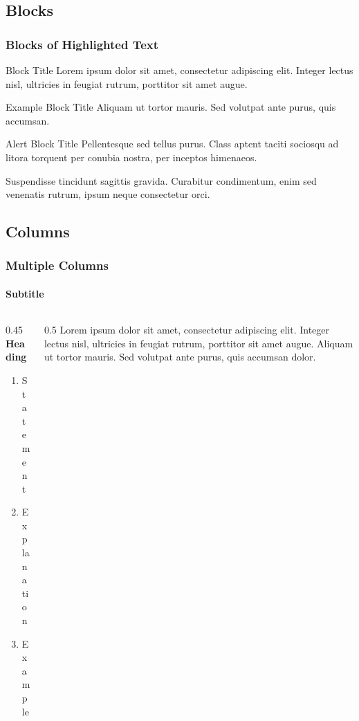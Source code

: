\documentclass[
	11pt, %
]{beamer}
\begin{document}

\subsection{Blocks}

\begin{frame}
	\frametitle{Blocks of Highlighted Text}
	
	\begin{block}{Block Title}
		Lorem ipsum dolor sit amet, consectetur adipiscing elit. Integer lectus nisl, ultricies in feugiat rutrum, porttitor sit amet augue.
	\end{block}
	
	\begin{exampleblock}{Example Block Title}
		Aliquam ut tortor mauris. Sed volutpat ante purus, quis accumsan.
	\end{exampleblock}
	
	\begin{alertblock}{Alert Block Title}
		Pellentesque sed tellus purus. Class aptent taciti sociosqu ad litora torquent per conubia nostra, per inceptos himenaeos.
	\end{alertblock}
	
	\begin{block}{} %
		Suspendisse tincidunt sagittis gravida. Curabitur condimentum, enim sed venenatis rutrum, ipsum neque consectetur orci.
	\end{block}
\end{frame}


\subsection{Columns}

\begin{frame}
	\frametitle{Multiple Columns}
	\framesubtitle{Subtitle} %
	
	\begin{columns}[c] %
		\begin{column}{0.45\textwidth} %
			\textbf{Heading}
			\begin{enumerate}
				\item Statement
				\item Explanation
				\item Example
			\end{enumerate}
		\end{column}
		\begin{column}{0.5\textwidth} %
			Lorem ipsum dolor sit amet, consectetur adipiscing elit. Integer lectus nisl, ultricies in feugiat rutrum, porttitor sit amet augue. Aliquam ut tortor mauris. Sed volutpat ante purus, quis accumsan dolor.
		\end{column}
	\end{columns}
\end{frame}
\end{document}
